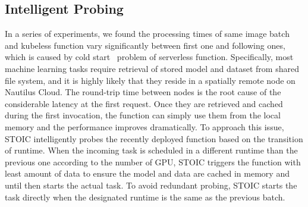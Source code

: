  \subsection{Intelligent Probing}
 In a series of experiments, we found the processing times of same image batch and kubeless function vary significantly between first one and following ones, which is caused by cold start~\cite{ref:coldstart} problem of serverless function. Specifically, most machine learning tasks require retrieval of stored model and dataset from shared file system, and it is highly likely that they reside in a spatially remote node on Nautilus Cloud. The round-trip time between nodes is the root cause of the considerable latency at the first request. Once they are retrieved and cached during the first invocation, the function can simply use them from the local memory and the performance improves dramatically. To approach this issue, STOIC intelligently probes the recently deployed function based on the transition of runtime. When the incoming task is scheduled in a different runtime than the previous one according to the number of GPU, STOIC triggers the function with least amount of data to ensure the model and data are cached in memory and until then starts the actual task. To avoid redundant probing,  STOIC starts the task directly when the designated runtime is the same as the previous batch.